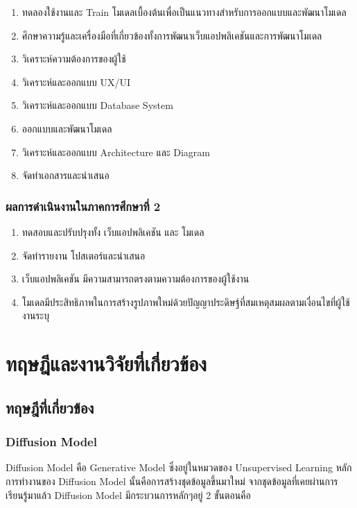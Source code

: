 \documentclass[12pt,oneside,openright,a4paper]{cpe-thai-project}
\begin{document}
\begin{enumerate}
  \item ทดลองใช้งานและ Train โมเดลเบื้องต้นเพื่อเป็นแนวทางสำหรับการออกแบบและพัฒนาโมเดล
  \item ศึกษาความรู้และเครื่องมือที่เกี่ยวข้องทั้งการพัฒนาเว็บแอปพลิเคชันและการพัฒนาโมเดล
  \item วิเคราะห์ความต้องการของผู้ใช้
  \item วิเคราะห์และออกแบบ UX/UI
  \item วิเคราะห์และออกแบบ Database System
  \item ออกแบบและพัฒนาโมเดล
  \item วิเคราะห์และออกแบบ Architecture และ Diagram
  \item จัดทำเอกสารและนำเสนอ
\end{enumerate}

\subsection{ผลการดำเนินงานในภาคการศึกษาที่ 2}

\begin{enumerate}
  \item ทดสอบและปรับปรุงทั้ง เว็บแอปพลิเคชัน และ โมเดล
  \item จัดทำรายงาน โปสเตอร์และนำเสนอ
  \item เว็บแอปพลิเคชัน มีความสามารถตรงตามความต้องการของผู้ใช้งาน
  \item โมเดลมีประสิทธิภาพในการสร้างรูปภาพใหม่ด้วยปัญญาประดิษฐ์ที่สมเหตุสมผลตามเงื่อนไขที่ผู้ใช้งานระบุ
\end{enumerate}

\chapter{ทฤษฎีและงานวิจัยที่เกี่ยวข้อง}


\section{ทฤษฎีที่เกี่ยวข้อง}

\subsection{Diffusion Model}
\hspace {18pt}Diffusion Model \cite{stable} คือ Generative Model ซึ่งอยู่ในหมวดของ Unsupervised Learning
หลักการทำงานของ Diffusion Model นั้นคือการสร้างชุดข้อมูลขึ้นมาใหม่ จากชุดข้อมูลที่เคยผ่านการเรียนรู้มาแล้ว Diffusion Model มีกระบวนการหลักๆอยู่ 2 ขั้นตอนคือ
\end{document}
